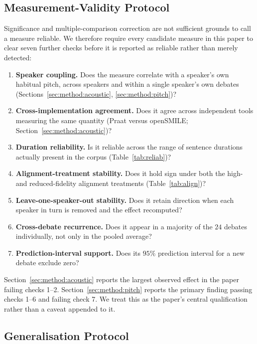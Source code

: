 \documentclass[pdflatex,sn-mathphys-num]{sn-jnl}%
\begin{document}
\subsection{Measurement-Validity Protocol}
\label{sec:method:validity}

Significance and multiple-comparison correction are not sufficient grounds to
call a measure reliable. We therefore require every candidate measure in this
paper to clear seven further checks before it is reported as reliable rather
than merely detected:

\begin{enumerate}\itemsep2pt
  \item \textbf{Speaker coupling.} Does the measure correlate with a
        speaker's own habitual pitch, across speakers and within a single
        speaker's own debates (Sections~\ref{sec:method:acoustic},
        \ref{sec:method:pitch})?
  \item \textbf{Cross-implementation agreement.} Does it agree across
        independent tools measuring the same quantity (Praat versus
        openSMILE; Section~\ref{sec:method:acoustic})?
  \item \textbf{Duration reliability.} Is it reliable across the range of
        sentence durations actually present in the corpus
        (Table~\ref{tab:reliab})?
  \item \textbf{Alignment-treatment stability.} Does it hold sign under both
        the high- and reduced-fidelity alignment treatments
        (Table~\ref{tab:align})?
  \item \textbf{Leave-one-speaker-out stability.} Does it retain direction
        when each speaker in turn is removed and the effect recomputed?
  \item \textbf{Cross-debate recurrence.} Does it appear in a majority of the
        $24$ debates individually, not only in the pooled average?
  \item \textbf{Prediction-interval support.} Does its $95\%$ prediction
        interval for a new debate exclude zero?
\end{enumerate}
Section~\ref{sec:method:acoustic} reports the largest observed effect in the
paper failing checks 1--2. Section~\ref{sec:method:pitch} reports the primary
finding passing checks 1--6 and failing check 7. We treat this as the
paper's central qualification rather than a caveat appended to it.

\subsection{Generalisation Protocol}
\label{sec:method:genprotocol}
\end{document}
